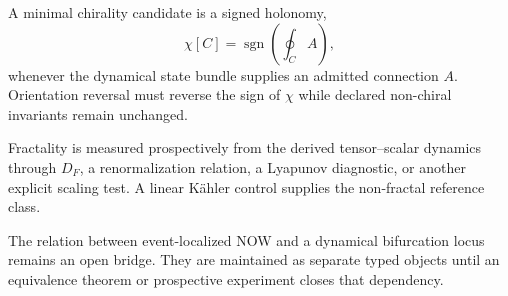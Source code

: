 \documentclass[11pt]{book}
\begin{document}
A minimal chirality candidate is a signed holonomy,
\[
\chi[C]=\operatorname{sgn}\!\left(\oint_C A\right),
\]
whenever the dynamical state bundle supplies an admitted connection \(A\). Orientation reversal must reverse the sign of \(\chi\) while declared non-chiral invariants remain unchanged.

Fractality is measured prospectively from the derived tensor--scalar dynamics through \(D_F\), a renormalization relation, a Lyapunov diagnostic, or another explicit scaling test. A linear Kähler control supplies the non-fractal reference class.

The relation between event-localized NOW and a dynamical bifurcation locus remains an open bridge. They are maintained as separate typed objects until an equivalence theorem or prospective experiment closes that dependency.
\end{document}
